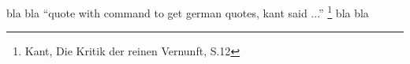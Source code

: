 bla bla \enquote{quote with command to get german quotes, kant said ...} \footnote{Kant, Die Kritik der reinen Vernunft, S.12} bla bla